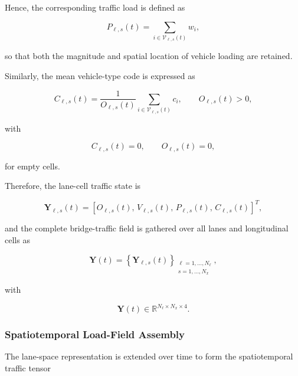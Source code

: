 \documentclass[journal]{IEEEtran}
\begin{document}
Hence, the corresponding traffic load is defined as

\begin{equation}
P_{\ell,s}(t)
=
\sum_{i\in\mathcal{V}_{\ell,s}(t)}
w_i,
\label{eq:cell_load}
\end{equation}

so that both the magnitude and spatial location of vehicle loading are retained.

Similarly, the mean vehicle-type code is expressed as

\begin{equation}
C_{\ell,s}(t)
=
\frac{1}{O_{\ell,s}(t)}
\sum_{i\in\mathcal{V}_{\ell,s}(t)}
c_i,
\qquad
O_{\ell,s}(t)>0,
\label{eq:mean_vehicle_type}
\end{equation}

with

\begin{equation}
C_{\ell,s}(t)=0,
\qquad
O_{\ell,s}(t)=0,
\label{eq:empty_vehicle_type}
\end{equation}

for empty cells.

Therefore, the lane-cell traffic state is

\begin{equation}
\mathbf{Y}_{\ell,s}(t)
=
\left[
O_{\ell,s}(t),\,
V_{\ell,s}(t),\,
P_{\ell,s}(t),\,
C_{\ell,s}(t)
\right]^{T},
\label{eq:lane_cell_state}
\end{equation}

and the complete bridge-traffic field is gathered over all lanes and longitudinal cells as

\begin{equation}
\mathbf{Y}(t)
=
\left\{
\mathbf{Y}_{\ell,s}(t)
\right\}_{
\substack{
\ell=1,\ldots,N_{\ell}\\
s=1,\ldots,N_x
}},
\label{eq:traffic_field}
\end{equation}

with

\begin{equation}
\mathbf{Y}(t)
\in
\mathbb{R}^{N_{\ell}\times N_x\times 4}.
\label{eq:traffic_field_dimension}
\end{equation}


\subsubsection{Spatiotemporal Load-Field Assembly}
\label{subsec:spatiotemporal_field}

The lane-space representation is extended over time to form the spatiotemporal traffic tensor
\end{document}
